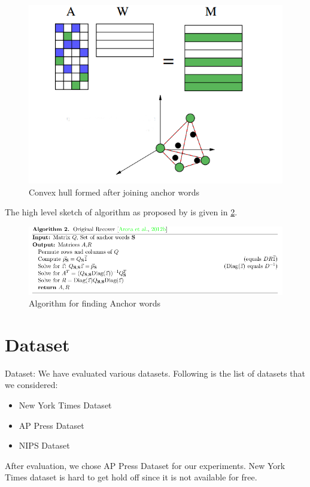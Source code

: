 \documentclass[a4paper,11pt]{article}
\begin{document}
\begin{figure}[htb]
\includegraphics[scale=0.4]{convexhull.png}
\caption{Convex hull formed after joining anchor words \cite{tm}}
\label{fig:convexhull}
\end{figure}
The high level sketch of algorithm as proposed by \cite{tm} is given in \ref{fig:algorithm}.

\begin{figure}[htb]
\includegraphics[scale=0.5]{algorithm.png}
\caption{Algorithm for finding Anchor words }
\label{fig:algorithm}
\end{figure}

\section{Dataset}
Dataset: We have evaluated various datasets. Following is the list of datasets that we considered:

\begin{itemize}
\item New York Times Dataset
\item AP Press Dataset
\item NIPS Dataset
\end{itemize}

After evaluation, we chose AP Press Dataset for our experiments. New York Times dataset is hard to get hold off since it is not available for free.
\end{document}

